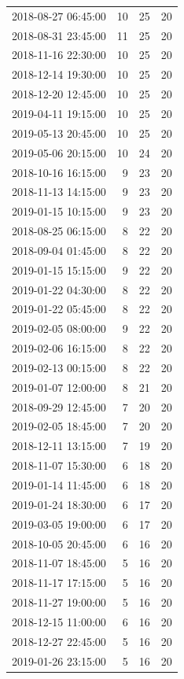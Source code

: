 \begin{tabular}{lrrr}
2018-08-27 06:45:00 & 10 & 25 & 20 \\
2018-08-31 23:45:00 & 11 & 25 & 20 \\
2018-11-16 22:30:00 & 10 & 25 & 20 \\
2018-12-14 19:30:00 & 10 & 25 & 20 \\
2018-12-20 12:45:00 & 10 & 25 & 20 \\
2019-04-11 19:15:00 & 10 & 25 & 20 \\
2019-05-13 20:45:00 & 10 & 25 & 20 \\
2019-05-06 20:15:00 & 10 & 24 & 20 \\
2018-10-16 16:15:00 & 9 & 23 & 20 \\
2018-11-13 14:15:00 & 9 & 23 & 20 \\
2019-01-15 10:15:00 & 9 & 23 & 20 \\
2018-08-25 06:15:00 & 8 & 22 & 20 \\
2018-09-04 01:45:00 & 8 & 22 & 20 \\
2019-01-15 15:15:00 & 9 & 22 & 20 \\
2019-01-22 04:30:00 & 8 & 22 & 20 \\
2019-01-22 05:45:00 & 8 & 22 & 20 \\
2019-02-05 08:00:00 & 9 & 22 & 20 \\
2019-02-06 16:15:00 & 8 & 22 & 20 \\
2019-02-13 00:15:00 & 8 & 22 & 20 \\
2019-01-07 12:00:00 & 8 & 21 & 20 \\
2018-09-29 12:45:00 & 7 & 20 & 20 \\
2019-02-05 18:45:00 & 7 & 20 & 20 \\
2018-12-11 13:15:00 & 7 & 19 & 20 \\
2018-11-07 15:30:00 & 6 & 18 & 20 \\
2019-01-14 11:45:00 & 6 & 18 & 20 \\
2019-01-24 18:30:00 & 6 & 17 & 20 \\
2019-03-05 19:00:00 & 6 & 17 & 20 \\
2018-10-05 20:45:00 & 6 & 16 & 20 \\
2018-11-07 18:45:00 & 5 & 16 & 20 \\
2018-11-17 17:15:00 & 5 & 16 & 20 \\
2018-11-27 19:00:00 & 5 & 16 & 20 \\
2018-12-15 11:00:00 & 6 & 16 & 20 \\
2018-12-27 22:45:00 & 5 & 16 & 20 \\
2019-01-26 23:15:00 & 5 & 16 & 20 \\

\end{tabular}

